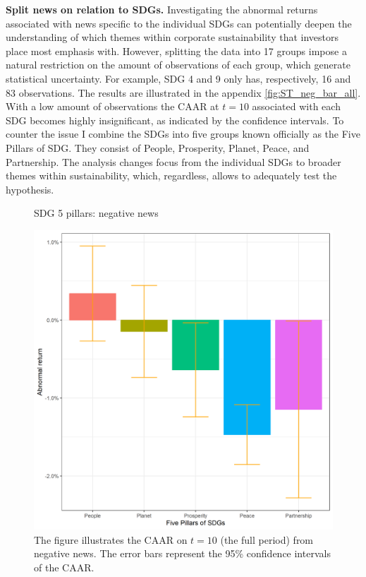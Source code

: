 \noindent \textbf{Split news on relation to SDGs.} Investigating the abnormal returns associated with news specific to the individual SDGs can potentially deepen the understanding of which themes within corporate sustainability that investors place most emphasis with. However, splitting the data into 17 groups impose a natural restriction on the amount of observations of each group, which generate statistical uncertainty. For example, SDG 4 and 9 only has, respectively, 16 and 83 observations. The results are illustrated in the appendix \ref{fig:ST_neg_bar_all}. With a low amount of observations the CAAR at $t = 10$ associated with each SDG becomes highly insignificant, as indicated by the confidence intervals. To counter the issue I combine the SDGs into five groups known officially as the Five Pillars of SDG. They consist of People, Prosperity, Planet, Peace, and Partnership. The analysis changes focus from the individual SDGs to broader themes within sustainability, which, regardless, allows to adequately test the hypothesis.

\begin{figure} [H]
    \centering
    \caption{SDG 5 pillars: negative news}
    \includegraphics[scale=0.6]{Projekt/1.Figures analysis/ST_negative_sdg_bar_groups_0.png}
    \caption*{\footnotesize The figure illustrates the CAAR on $t = 10$ (the full period) from negative news. The error bars represent the 95\% confidence intervals of the CAAR.}
    \label{fig:ST_neg_bar}
\end{figure}



